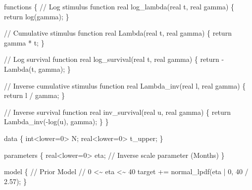 \documentclass[
  letterpaper,
  DIV=11,
  numbers=noendperiod]{scrartcl}
\newenvironment{Shaded}{\begin{snugshade}}{\end{snugshade}}
\newcommand{\CommentTok}[1]{\textcolor[rgb]{0.37,0.37,0.37}{#1}}
\newcommand{\ControlFlowTok}[1]{\textcolor[rgb]{0.00,0.23,0.31}{#1}}
\newcommand{\DataTypeTok}[1]{\textcolor[rgb]{0.68,0.00,0.00}{#1}}
\newcommand{\DecValTok}[1]{\textcolor[rgb]{0.68,0.00,0.00}{#1}}
\newcommand{\FloatTok}[1]{\textcolor[rgb]{0.68,0.00,0.00}{#1}}
\newcommand{\KeywordTok}[1]{\textcolor[rgb]{0.00,0.23,0.31}{#1}}
\newcommand{\NormalTok}[1]{\textcolor[rgb]{0.00,0.23,0.31}{#1}}
\begin{document}
\begin{codelisting}

\caption{\texttt{model1\textbackslash\_prior.stan}}

\begin{Shaded}
\begin{Highlighting}[]
\KeywordTok{functions}\NormalTok{ \{}
  \CommentTok{// Log stimulus function}
  \DataTypeTok{real}\NormalTok{ log\_lambda(}\DataTypeTok{real}\NormalTok{ t, }\DataTypeTok{real}\NormalTok{ gamma) \{}
    \ControlFlowTok{return}\NormalTok{ log(gamma);}
\NormalTok{  \}}
  
  \CommentTok{// Cumulative stimulus function}
  \DataTypeTok{real}\NormalTok{ Lambda(}\DataTypeTok{real}\NormalTok{ t, }\DataTypeTok{real}\NormalTok{ gamma) \{}
    \ControlFlowTok{return}\NormalTok{ gamma * t;}
\NormalTok{  \}}

  \CommentTok{// Log survival function}
  \DataTypeTok{real}\NormalTok{ log\_survival(}\DataTypeTok{real}\NormalTok{ t, }\DataTypeTok{real}\NormalTok{ gamma) \{}
    \ControlFlowTok{return}\NormalTok{ {-}Lambda(t, gamma);}
\NormalTok{  \}}

  \CommentTok{// Inverse cumulative stimulus function}
  \DataTypeTok{real}\NormalTok{ Lambda\_inv(}\DataTypeTok{real}\NormalTok{ l, }\DataTypeTok{real}\NormalTok{ gamma) \{}
    \ControlFlowTok{return}\NormalTok{ l / gamma;}
\NormalTok{  \}}
  
  \CommentTok{// Inverse survival function}
  \DataTypeTok{real}\NormalTok{ inv\_survival(}\DataTypeTok{real}\NormalTok{ u, }\DataTypeTok{real}\NormalTok{ gamma) \{}
    \ControlFlowTok{return}\NormalTok{ Lambda\_inv({-}log(u), gamma);}
\NormalTok{  \}}
\NormalTok{\}}

\KeywordTok{data}\NormalTok{ \{}
  \DataTypeTok{int}\NormalTok{\textless{}}\KeywordTok{lower}\NormalTok{=}\DecValTok{0}\NormalTok{\textgreater{} N;}
  \DataTypeTok{real}\NormalTok{\textless{}}\KeywordTok{lower}\NormalTok{=}\DecValTok{0}\NormalTok{\textgreater{} t\_upper;}
\NormalTok{\}}

\KeywordTok{parameters}\NormalTok{ \{}
  \DataTypeTok{real}\NormalTok{\textless{}}\KeywordTok{lower}\NormalTok{=}\DecValTok{0}\NormalTok{\textgreater{} eta; }\CommentTok{// Inverse scale parameter (Months)}
\NormalTok{\}}

\KeywordTok{model}\NormalTok{ \{}
  \CommentTok{// Prior Model}
  \CommentTok{// 0 \textless{}\textasciitilde{} eta \textless{}\textasciitilde{} 40}
  \KeywordTok{target +=}\NormalTok{ normal\_lpdf(eta | }\DecValTok{0}\NormalTok{, }\DecValTok{40}\NormalTok{ / }\FloatTok{2.57}\NormalTok{);}
\NormalTok{\}}


\end{Highlighting}
\end{Shaded}
\end{codelisting}
\end{document}
